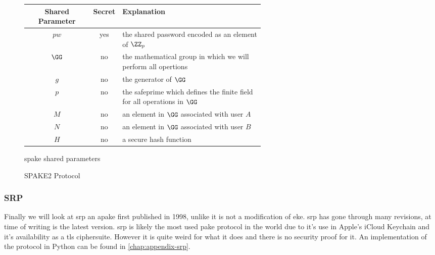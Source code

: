 \begin{figure}[H]
  \centering

  \begin{tabular}{ |c|c|p{0.6\linewidth}| }
    \hline
    Shared Parameter & Secret & Explanation \\
    \hline
    $pw$ & yes & the shared password encoded as an element of $\ZZ_p$ \\ \hline
    $\GG$ & no & the mathematical group in which we will perform all opertions \\  \hline
    $g$ & no & the generator of $\GG$ \\ \hline
    $p$ & no & the \gls{safeprime} which defines the finite field for all operations in $\GG$ \\ \hline
    $M$ & no & an element in $\GG$ associated with user $A$ \\ \hline
    $N$ & no & an element in $\GG$ associated with user $B$ \\ \hline
    $H$ & no & a secure hash function \\ \hline
  \end{tabular}

  \caption{\gls{spake} shared parameters}
  \label{fig:spake-shared-params}
\end{figure}

\begin{figure}[H]

  \caption{SPAKE2 Protocol}
  \label{fig:spake2}
\end{figure}

\clearpage

\subsubsection{SRP}
Finally we will look at \gls{srp} an \gls{apake} first published in 1998, unlike  it is not a modification of \gls{eke}.
\gls{srp} has gone through many revisions, at time of writing  is the latest version.
\gls{srp} is likely the most used \gls{pake} protocol in the world due to it's use in Apple's iCloud Keychain\cite{apple-keychain-srp} and it's availability as a \gls{tls} ciphersuite\cite{tls-srp}.
However it is quite weird for what it does and there is no security proof for it\cite{srp-blog}. An implementation of the protocol in Python can be found in \cref{chap:appendix-srp}.

